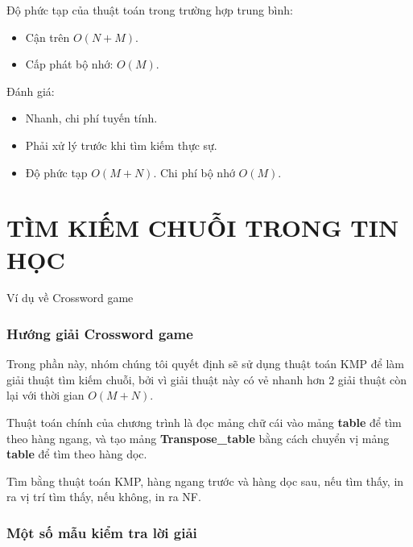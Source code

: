 \documentclass[a4paper,11pt]{article}
\begin{document}
\begin{enumerate}
			Độ phức tạp của thuật toán trong trường hợp trung bình:
			\begin{itemize}
				\item Cận trên $O(N + M)$.
				\item Cấp phát bộ nhớ: $O(M)$.
			\end{itemize}

			Đánh giá:
			\begin{itemize}
				\item Nhanh, chi phí tuyến tính.
				\item Phải xử lý trước khi tìm kiếm thực sự.
				\item Độ phức tạp $O(M + N)$. Chi phí bộ nhớ $O(M)$.
			\end{itemize}
	\end{enumerate}
	
	\part*{TÌM KIẾM CHUỖI TRONG TIN HỌC}
	\Large {Ví dụ về Crossword game}
	\setcounter{section}{0}
	\section{Hướng giải Crossword game}

	Trong phần này, nhóm chúng tôi quyết định sẽ sử dụng thuật toán KMP để làm giải thuật tìm kiếm chuỗi, bởi vì giải thuật này có vẻ nhanh hơn 2 giải thuật còn lại với thời gian $O(M + N)$.

	Thuật toán chính của chương trình là đọc mảng chữ cái vào mảng \textbf{table} để tìm theo hàng ngang, và tạo mảng \textbf{Transpose\_table} bằng cách chuyển vị mảng \textbf{table} để tìm theo hàng dọc.

	Tìm bằng thuật toán KMP, hàng ngang trước và hàng dọc sau, nếu tìm thấy, in ra vị trí tìm thấy, nếu không, in ra NF.
	\section{Một số mẫu kiểm tra lời giải}
	
\end{document}
